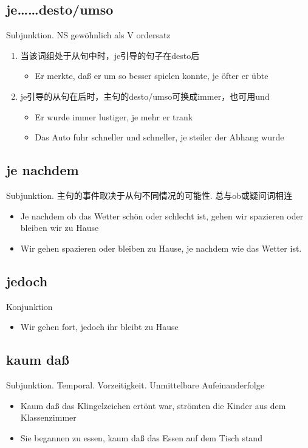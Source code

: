 \documentclass[UTF8]{report}
\begin{document}
\subsection{je……desto/umso}
Subjunktion. NS gewöhnlich als V ordersatz
\begin{enumerate}
    \item 当该词组处于从句中时，je引导的句子在desto后
    \begin{itemize}
        \item Er merkte, daß er um so besser spielen konnte, je öfter er übte
    \end{itemize}
    \item je引导的从句在后时，主句的desto/umso可换成immer，也可用und
    \begin{itemize}
        \item Er wurde immer lustiger, je mehr er trank
        \item Das Auto fuhr schneller und schneller, je steiler der Abhang wurde
    \end{itemize}
\end{enumerate}


\subsection{je nachdem}
Subjunktion. 主句的事件取决于从句不同情况的可能性. 总与ob或疑问词相连
\begin{itemize}
    \item Je nachdem ob das Wetter schön oder schlecht ist, gehen wir spazieren oder bleiben wir zu Hause
    \item Wir gehen spazieren oder bleiben zu Hause, je nachdem wie das Wetter ist.
\end{itemize}

\subsection{jedoch}
Konjunktion
\begin{itemize}
    \item Wir gehen fort, jedoch ihr bleibt zu Hause
\end{itemize}

\subsection{kaum daß}
Subjunktion. Temporal. Vorzeitigkeit. Unmittelbare Aufeinanderfolge
\begin{itemize}
    \item Kaum daß das Klingelzeichen ertönt war, strömten die Kinder aus dem Klassenzimmer
    \item Sie begannen zu essen, kaum daß das Essen auf dem Tisch stand
\end{itemize}
\end{document}
